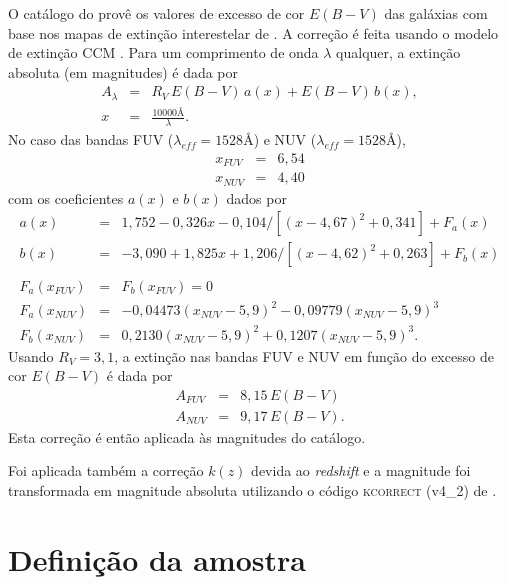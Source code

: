 O catálogo do \galex provê os valores de excesso de cor $E(B-V)$ das galáxias
com base nos mapas de extinção interestelar de \citet{Schlegel1998}. A correção
é feita usando o modelo de extinção CCM \citep[equações 4a e 4b]{Cardelli1989}.
Para um comprimento de onda $\lambda$ qualquer, a extinção absoluta (em
magnitudes) é dada por
\begin{eqnarray*}
	A_\lambda &=& R_V\,E(B-V)\,a(x) + E(B-V)\,b(x), \\
	x &=& \frac{10000\text{\AA}}{\lambda}.
\end{eqnarray*}
No caso das bandas FUV ($\lambda_{eff}=1528\text{\AA}$) e NUV
($\lambda_{eff}=1528\text{\AA}$),
\begin{eqnarray*}
	x_{FUV} &=& 6,54\\
	x_{NUV} &=& 4,40
\end{eqnarray*}
com os coeficientes $a(x)$ e $b(x)$ dados por
\begin{eqnarray*}
	a(x) &=& 1,752 - 0,326x - 0,104/[(x-4,67)^2 + 0,341] + F_a(x) \\
	b(x) &=& -3,090 + 1,825x + 1,206/[(x-4,62)^2 + 0,263] + F_b(x) \\
	\\
	F_a(x_{FUV}) &=& F_b(x_{FUV}) = 0 \\
	F_a(x_{NUV}) &=& -0,04473(x_{NUV}-5,9)^2 - 0,09779(x_{NUV}-5,9)^3 \\
	F_b(x_{NUV}) &=& 0,2130(x_{NUV}-5,9)^2 + 0,1207(x_{NUV}-5,9)^3.
\end{eqnarray*}
Usando $R_V=3,1$, a extinção nas bandas FUV e NUV em função do excesso de cor
$E(B-V)$ é dada por
\begin{eqnarray*}
	A_{FUV} &=& 8,15\,E(B-V) \\
	A_{NUV} &=& 9,17\,E(B-V).
\end{eqnarray*}
Esta correção é então aplicada às magnitudes do catálogo.

Foi aplicada também a correção $k(z)$ devida ao {\em redshift} e a magnitude foi
transformada em magnitude absoluta utilizando o código \textsc{kcorrect} (v4\_2)
de \citet{Blanton2007}.



\section{Definição da amostra \STARLIGHTUV}
\label{sec:Crossmatch:DefAmostras:StarlightUV}

